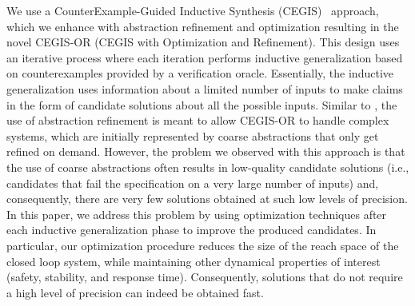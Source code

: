 \documentclass[a4paper,UKenglish]{lipics-v2018}
\begin{document}

We use a CounterExample-Guided Inductive Synthesis
(CEGIS)~\cite{jha-icse10, DBLP:conf/asplos/Solar-LezamaTBSS06}
approach, which we enhance with abstraction refinement and
optimization resulting in the novel CEGIS-OR (CEGIS with Optimization
and Refinement).  This design uses an iterative process where each
iteration performs inductive generalization based on counterexamples
provided by a verification oracle.  Essentially, the inductive
generalization uses information about a limited number of inputs to
make claims in the form of candidate solutions about all the possible
inputs.  Similar to \cite{DBLP:conf/cav/AbateBCCDKKP17}, the use of
abstraction refinement is meant to allow CEGIS-OR to handle complex
systems, which are initially represented by coarse abstractions that
only get refined on demand.  However, the problem we observed with
this approach is that the use of coarse abstractions often results in
low-quality candidate solutions (i.e., candidates that fail the
specification on a very large number of inputs) and, consequently, there
are very few solutions obtained at such low levels of precision.
In this paper, we address this problem by using 
optimization techniques after each inductive generalization phase to improve
the produced candidates.  In particular, our optimization procedure reduces
the size of the reach space of the closed loop system, while maintaining
other dynamical properties of interest (safety, stability, and response
time).
Consequently, solutions that do not require a
high level of precision can indeed be obtained fast.


\end{document}
